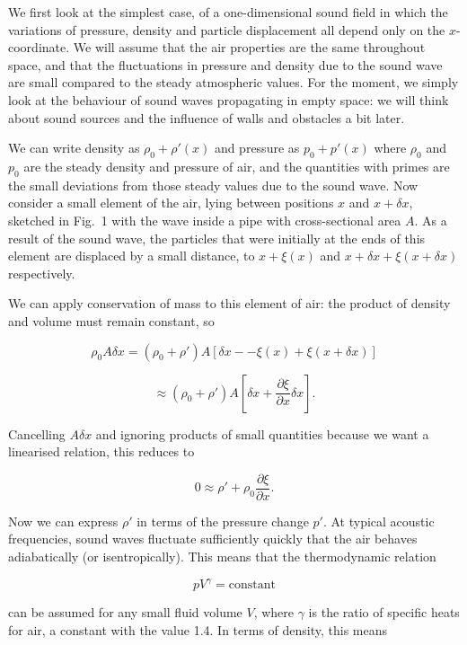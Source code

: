   We first look at the simplest case, of a one-dimensional sound field in which 
  the variations of pressure, density and particle displacement all depend only 
  on the $x$-coordinate. We will assume that the air properties are the same 
  throughout space, and that the fluctuations in pressure and density due to 
  the sound wave are small compared to the steady atmospheric values. For the 
  moment, we simply look at the behaviour of sound waves propagating in empty 
  space: we will think about sound sources and the influence of walls and 
  obstacles a bit later. 

  We can write density as $\rho_0 + \rho'(x)$ and pressure as $p_0 + p'(x)$ 
  where $\rho_0$ and $p_0$ are the steady density and pressure of air, and the 
  quantities with primes are the small deviations from those steady values due 
  to the sound wave. Now consider a small element of the air, lying between 
  positions $x$ and $x+\delta x$, sketched in Fig.\ 1 with the wave inside a 
  pipe with cross-sectional area $A$. As a result of the sound wave, the 
  particles that were initially at the ends of this element are displaced by a 
  small distance, to $x+\xi(x)$ and $x + \delta x + \xi(x + \delta x)$ 
  respectively. 


  We can apply conservation of mass to this element of air: the product of 
  density and volume must remain constant, so 

  $$\rho_0 A \delta x = (\rho_0 + \rho') A [\delta x -- \xi(x) + \xi(x+ \delta 
  x)] $$ 

  $$\approx (\rho_0 + \rho') A \left[\delta x + \frac{\partial \xi}{\partial x} 
  \delta x \right] . \tag{1}$$ 

  Cancelling $A \delta x$ and ignoring products of small quantities because we 
  want a linearised relation, this reduces to 

  $$0 \approx \rho' + \rho_0 \frac{\partial \xi}{\partial x} .\tag{2}$$ 

  Now we can express $\rho'$ in terms of the pressure change $p'$. At typical 
  acoustic frequencies, sound waves fluctuate sufficiently quickly that the air 
  behaves adiabatically (or isentropically). This means that the thermodynamic 
  relation 

  $$p V^\gamma = \mathrm{constant} \tag{3}$$ 

  can be assumed for any small fluid volume $V$, where $\gamma$ is the ratio of 
  specific heats for air, a constant with the value 1.4. In terms of density, 
  this means 

